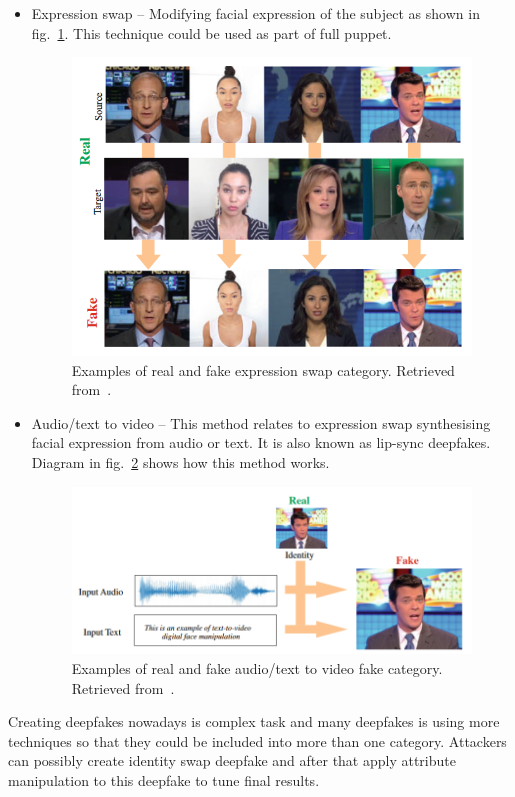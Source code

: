 \begin{itemize}
    \item Expression swap – Modifying facial expression of the subject as shown in fig.~\ref{fig:expression_swap}. This technique could be used as part of full puppet.
    \begin{figure}[H]
        \centering
        \includegraphics[width=.52\linewidth]{other-fig/expression_swap.png}
        \caption{Examples of real and fake expression swap category. Retrieved from~\cite{IntroductionToDigitalFaceManipulation}.}
        \label{fig:expression_swap}
    \end{figure}

    \item Audio/text to video – This method relates to expression swap synthesising facial expression from audio or text. It is also known as lip-sync deepfakes. Diagram in fig.~\ref{fig:audio_to_video} shows how this method works.
    \begin{figure}[H]
        \centering
        \includegraphics[width=.6\linewidth]{other-fig/audio_to_video.png}
        \caption{Examples of real and fake audio/text to video fake category. Retrieved from~\cite{IntroductionToDigitalFaceManipulation}.}
        \label{fig:audio_to_video}
    \end{figure}
\end{itemize}

Creating deepfakes nowadays is complex task and many deepfakes is using more techniques so that they could be included into more than one category. Attackers can possibly create identity swap deepfake and after that apply attribute manipulation to this deepfake to tune final results.

